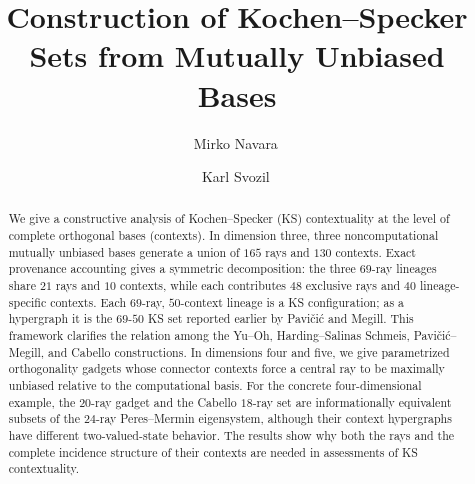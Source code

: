\documentclass[%
  reprint,
  superscriptaddress,
  showkeys,
  amsmath,amssymb,
  aps,pra,
  longbibliography,
  floatfix,
  x11names
]{revtex4-2}
\begin{document}
\title{Construction of Kochen--Specker Sets from Mutually Unbiased Bases}

\author{Mirko Navara\,}


\author{Karl Svozil\,}


\begin{abstract}
We give a constructive analysis of Kochen--Specker (KS) contextuality at the level of complete orthogonal bases (contexts). In dimension three, three noncomputational mutually unbiased bases generate a union of $165$ rays and $130$ contexts. Exact provenance accounting gives a symmetric decomposition: the three $69$-ray lineages share $21$ rays and $10$ contexts, while each contributes $48$ exclusive rays and $40$ lineage-specific contexts. Each $69$-ray, $50$-context lineage is a KS configuration; as a hypergraph it is the $69$-$50$ KS set reported earlier by Pavi\v{c}i\'{c} and Megill. This framework clarifies the relation among the Yu--Oh, Harding--Salinas Schmeis, Pavi\v{c}i\'{c}--Megill, and Cabello constructions. In dimensions four and five, we give parametrized orthogonality gadgets whose connector contexts force a central ray to be maximally unbiased relative to the computational basis. For the concrete four-dimensional example, the $20$-ray gadget and the Cabello $18$-ray set are informationally equivalent subsets of the $24$-ray Peres--Mermin eigensystem, although their context hypergraphs have different two-valued-state behavior. The results show why both the rays and the complete incidence structure of their contexts are needed in assessments of KS contextuality.
\end{abstract}


\maketitle
\end{document}
